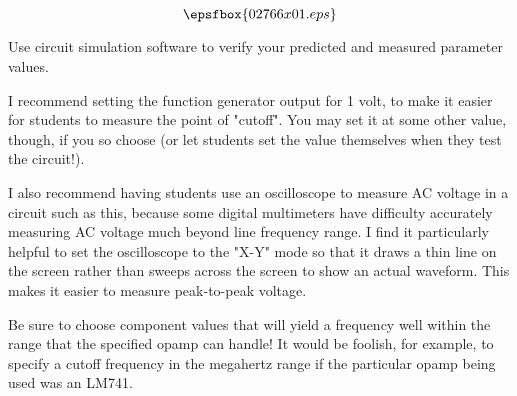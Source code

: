 

$$\epsfbox{02766x01.eps}$$

\vfil \eject






Use circuit simulation software to verify your predicted and measured parameter values.







I recommend setting the function generator output for 1 volt, to make it easier for students to measure the point of "cutoff".  You may set it at some other value, though, if you so choose (or let students set the value themselves when they test the circuit!).

I also recommend having students use an oscilloscope to measure AC voltage in a circuit such as this, because some digital multimeters have difficulty accurately measuring AC voltage much beyond line frequency range.  I find it particularly helpful to set the oscilloscope to the "X-Y" mode so that it draws a thin line on the screen rather than sweeps across the screen to show an actual waveform.  This makes it easier to measure peak-to-peak voltage.

Be sure to choose component values that will yield a frequency well within the range that the specified opamp can handle!  It would be foolish, for example, to specify a cutoff frequency in the megahertz range if the particular opamp being used was an LM741.




